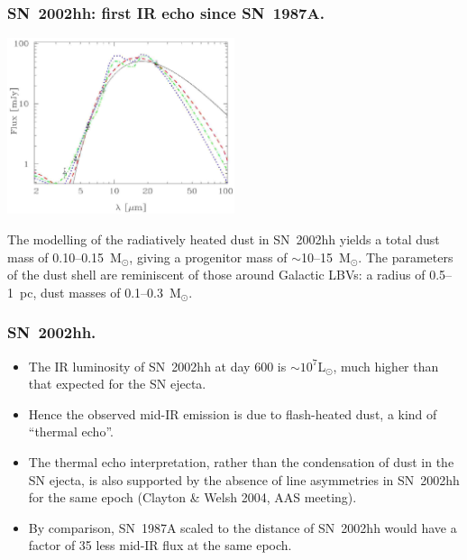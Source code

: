 \begin{frame}\frametitle{SN~2002hh: first IR echo since SN~1987A.}

\begin{center}
\includegraphics[width=0.5\textwidth,height=!]{./D/barlow_sn2002hh_fig2.jpg}
\end{center}
\vfill The modelling of the radiatively heated dust in SN~2002hh
yields a total dust mass of 0.10--0.15~M$_\odot$, giving a progenitor
mass of $\sim$10--15~M$_\odot$. The parameters of the dust shell are
reminiscent of those around Galactic LBVs: a radius of 0.5--1~pc, dust
masses of 0.1--0.3~M$_\odot$.


\end{frame}
\begin{frame}\frametitle{SN~2002hh.}

\begin{itemize}

\item The IR luminosity of SN~2002hh at day 600 is $\sim
  10^7$L$_\odot$, much higher than that expected for the SN ejecta. 


\item Hence the observed mid-IR emission is due to flash-heated dust,
  a kind of ``thermal echo''. 

\item The thermal echo interpretation, rather than the condensation of
  dust in the SN ejecta, is also supported by the absence of line
  asymmetries in SN~2002hh for the same epoch (Clayton \& Welsh 2004,
  AAS meeting).

\item By comparison, SN~1987A scaled to the distance of SN~2002hh
  would have a factor of 35 less mid-IR flux at the same epoch.


\end{itemize}

\end{frame}

